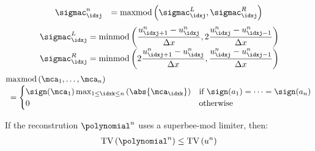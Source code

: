 \begin{defnbox}\nospacing
    \begin{defn}\label{defn:superbee_limiter}
        \begin{align}
         &\sigmac_{\idxj}^{n}&=\text{maxmod} \left(\sigmac_{\idxj}^{L},\sigmac_{\idxj}^{R}\right)
        \end{align}
        \begin{align*}
          \sigmac_{\idxj}^{L}&=\text{minmod} \left(\frac{u_{\idxj+1}^{n}-u_{\idxj}^{n}}{\Delta x},2\frac{u_{\idxj}^{n}-u_{\idxj-1}^{n}}{\Delta x}\right)\\[-1\jot]
          \sigmac_{\idxj}^{R}&=\text{minmod} \left(2\frac{u_{\idxj+1}^{n}-u_{\idxj}^{n}}{\Delta x},\frac{u_{\idxj}^{n}-u_{\idxj-1}^{n}}{\Delta x}\right)
        \end{align*}
        \begin{align}
          &\text{maxmod}\left(\mca_{1},\ldots,\mca_{n}\right)\\[-1\jot]
          &\hspace{1mm}=\begin{cases}
              \sign(\mca_{1})\max_{1\leq\idxk\leq n}\left(\abs{\mca_{\idxk}}\right)&\text{if }\sign(a_{1})=\cdots=\sign(a_{n}) \\
              0&\text{otherwise}
          \end{cases}\nonumber
        \end{align}
    \end{defn}
\end{defnbox}
\begin{corbox}\nospacing
    \begin{cor}\label{cor:superbee_is_tvd}
        If the reconstrution $\polynomial^{n}$ uses a superbee-mod limiter, then:
        \begin{align}
          \text{TV} \left(\polynomial^{n}\right)\leq \text{TV}\left(u^{n}\right)
        \end{align}
    \end{cor}
\end{corbox}
